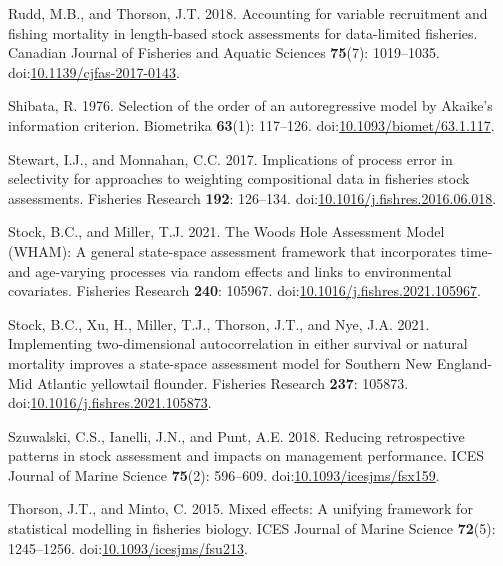 \documentclass[
  12pt,
]{article}
\newlength{\cslhangindent}
\newlength{\cslentryspacingunit} %
\newenvironment{CSLReferences}[2] %
 {%
  \setlength{\parindent}{0pt}
  \ifodd #1
  \let\oldpar\par
  \def\par{\hangindent=\cslhangindent\oldpar}
  \fi
  \setlength{\parskip}{#2\cslentryspacingunit}
 }%
 {}
\begin{document}
\begin{CSLReferences}{1}{0}
\leavevmode{}%
Rudd, M.B., and Thorson, J.T. 2018. Accounting for variable recruitment
and fishing mortality in length-based stock assessments for data-limited
fisheries. Canadian Journal of Fisheries and Aquatic Sciences
\textbf{75}(7): 1019--1035.
doi:\href{https://doi.org/10.1139/cjfas-2017-0143}{10.1139/cjfas-2017-0143}.

\leavevmode{}%
Shibata, R. 1976. Selection of the order of an autoregressive model by
{A}kaike's information criterion. Biometrika \textbf{63}(1): 117--126.
doi:\href{https://doi.org/10.1093/biomet/63.1.117}{10.1093/biomet/63.1.117}.

\leavevmode{}%
Stewart, I.J., and Monnahan, C.C. 2017. Implications of process error in
selectivity for approaches to weighting compositional data in fisheries
stock assessments. Fisheries Research \textbf{192}: 126--134.
doi:\href{https://doi.org/10.1016/j.fishres.2016.06.018}{10.1016/j.fishres.2016.06.018}.

\leavevmode{}%
Stock, B.C., and Miller, T.J. 2021. The {W}oods {H}ole {A}ssessment
{M}odel ({WHAM}): {A} general state-space assessment framework that
incorporates time- and age-varying processes via random effects and
links to environmental covariates. Fisheries Research \textbf{240}:
105967.
doi:\href{https://doi.org/10.1016/j.fishres.2021.105967}{10.1016/j.fishres.2021.105967}.

\leavevmode{}%
Stock, B.C., Xu, H., Miller, T.J., Thorson, J.T., and Nye, J.A. 2021.
{Implementing two-dimensional autocorrelation in either survival or
natural mortality improves a state-space assessment model for Southern
{N}ew {E}ngland-Mid {A}tlantic yellowtail flounder}. Fisheries Research
\textbf{237}: 105873.
doi:\href{https://doi.org/10.1016/j.fishres.2021.105873}{10.1016/j.fishres.2021.105873}.

\leavevmode{}%
Szuwalski, C.S., Ianelli, J.N., and Punt, A.E. 2018. Reducing
retrospective patterns in stock assessment and impacts on management
performance. ICES Journal of Marine Science \textbf{75}(2): 596--609.
doi:\href{https://doi.org/10.1093/icesjms/fsx159}{10.1093/icesjms/fsx159}.

\leavevmode{}%
Thorson, J.T., and Minto, C. 2015. Mixed effects: A unifying framework
for statistical modelling in fisheries biology. ICES Journal of Marine
Science \textbf{72}(5): 1245--1256.
doi:\href{https://doi.org/10.1093/icesjms/fsu213}{10.1093/icesjms/fsu213}.


\end{CSLReferences}
\end{document}
